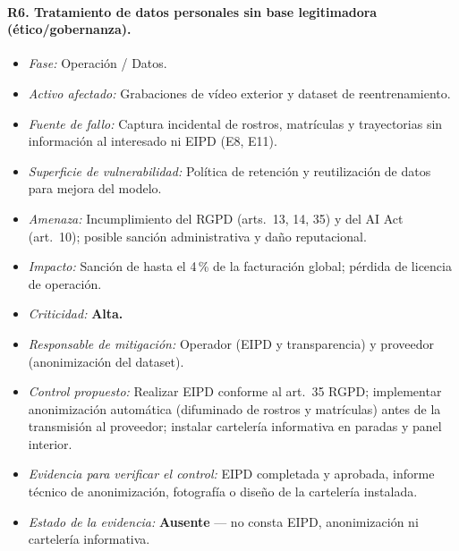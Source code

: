 \documentclass[11pt]{article}
\begin{document}
\paragraph{R6. Tratamiento de datos personales sin base legitimadora (ético/gobernanza).}
\begin{itemize}[nosep]
    \item \textit{Fase:} Operación / Datos.
    \item \textit{Activo afectado:} Grabaciones de vídeo exterior y dataset de reentrenamiento.
    \item \textit{Fuente de fallo:} Captura incidental de rostros, matrículas y trayectorias sin información al interesado ni EIPD (E8, E11).
    \item \textit{Superficie de vulnerabilidad:} Política de retención y reutilización de datos para mejora del modelo.
    \item \textit{Amenaza:} Incumplimiento del RGPD (arts.~13, 14, 35) y del AI Act (art.~10); posible sanción administrativa y daño reputacional.
    \item \textit{Impacto:} Sanción de hasta el 4\,\% de la facturación global; pérdida de licencia de operación.
    \item \textit{Criticidad:} \textbf{Alta.}
    \item \textit{Responsable de mitigación:} Operador (EIPD y transparencia) y proveedor (anonimización del dataset).
    \item \textit{Control propuesto:} Realizar EIPD conforme al art.~35 RGPD; implementar anonimización automática (difuminado de rostros y matrículas) antes de la transmisión al proveedor; instalar cartelería informativa en paradas y panel interior.
    \item \textit{Evidencia para verificar el control:} EIPD completada y aprobada, informe técnico de anonimización, fotografía o diseño de la cartelería instalada.
    \item \textit{Estado de la evidencia:} \textbf{Ausente} --- no consta EIPD, anonimización ni cartelería informativa.
\end{itemize}
\end{document}

